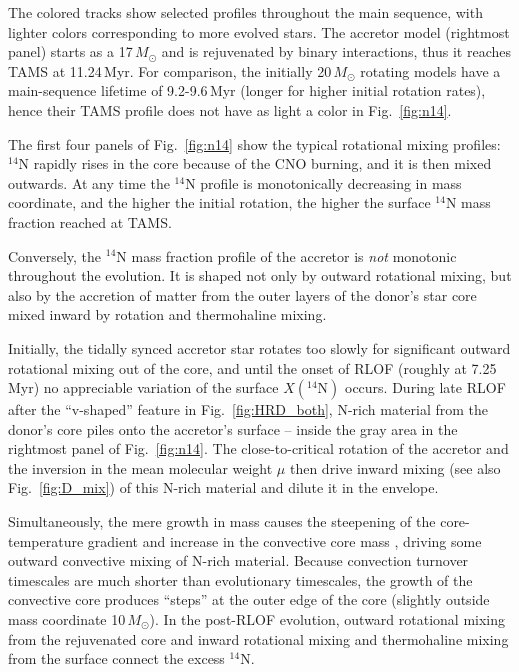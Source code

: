 \documentclass[twocolumn,twocolappendix,trackchanges]{aastex63}
\DeclareRobustCommand{\Figref}[1]{Fig.~\ref{#1}}
\begin{document}
The colored tracks show
selected profiles throughout the main sequence, with lighter colors
corresponding to more evolved stars. The accretor model
(rightmost panel) starts as a 17$\,M_\odot$ and is rejuvenated by
binary interactions, thus it reaches TAMS at 11.24\,Myr. For
comparison, the initially 20\,$M_\odot$ rotating models have a
main-sequence lifetime of 9.2-9.6\,Myr (longer for higher initial
rotation rates), hence their TAMS profile does not have as light a
color in \Figref{fig:n14}.

The first four panels of \Figref{fig:n14} show the typical rotational
mixing profiles: $^{14}\mathrm{N}$ rapidly rises in the core because
of the CNO burning, and it is then mixed outwards. At any time
the $^{14}\mathrm{N}$ profile is monotonically decreasing in mass
coordinate, and the higher the initial rotation, the higher the
surface $^{14}\mathrm{N}$ mass fraction reached at TAMS.

Conversely, the $^{14}\mathrm{N}$ mass fraction profile of the
accretor is \emph{not} monotonic throughout the evolution. It is shaped not only by outward
rotational mixing, but also by the accretion of matter from the outer
layers of the donor's star core mixed inward by rotation and
thermohaline mixing.

Initially, the tidally synced accretor star
rotates too slowly for significant outward rotational mixing out of
the core, and until the onset of RLOF (roughly at 7.25\,Myr) no appreciable variation of the
surface $X(^{14}\mathrm{N})$ occurs. During late RLOF after the
``v-shaped'' feature in \Figref{fig:HRD_both}, N-rich material from the
donor's core piles onto the accretor's surface -- inside the gray area in
the rightmost panel of \Figref{fig:n14}. The close-to-critical
rotation of the accretor and the inversion in the mean molecular
weight $\mu$ then drive inward mixing (see also \Figref{fig:D_mix}) of
this N-rich material and dilute it in the envelope.

Simultaneously, the mere growth in mass causes the steepening of the
core-temperature gradient and increase in the convective core mass
\citep[rejuvenation, e.g.,][]{schneider:16}, driving some outward convective mixing
of N-rich material. Because convection turnover timescales are much
shorter than evolutionary timescales, the growth of the convective
core produces ``steps'' at the outer edge of the core (slightly
outside mass coordinate 10\,$M_\odot$). In the post-RLOF evolution,
outward rotational mixing from the rejuvenated core and inward
rotational mixing and thermohaline mixing from the surface connect the
excess $^{14}\mathrm{N}$.
\end{document}
